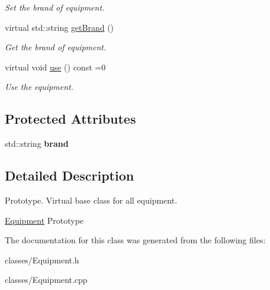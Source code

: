 \begin{DoxyCompactItemize}
\begin{DoxyCompactList}\small\item\em Set the brand of equipment. \end{DoxyCompactList}\item 
\hypertarget{class_equipment_adf98a9485c7dd511ee55b34e328f2eb0}{}virtual std\+::string \hyperlink{class_equipment_adf98a9485c7dd511ee55b34e328f2eb0}{get\+Brand} ()\label{class_equipment_adf98a9485c7dd511ee55b34e328f2eb0}

\begin{DoxyCompactList}\small\item\em Get the brand of equipment. \end{DoxyCompactList}\item 
\hypertarget{class_equipment_ad353e0121f958ee31f56ef7a7b4ff1e0}{}virtual void \hyperlink{class_equipment_ad353e0121f958ee31f56ef7a7b4ff1e0}{use} () const  =0\label{class_equipment_ad353e0121f958ee31f56ef7a7b4ff1e0}

\begin{DoxyCompactList}\small\item\em Use the equipment. \end{DoxyCompactList}\end{DoxyCompactItemize}
\subsection*{Protected Attributes}
\begin{DoxyCompactItemize}
\item 
\hypertarget{class_equipment_ac92b9e665801fbf45368c11470631d26}{}std\+::string {\bfseries brand}\label{class_equipment_ac92b9e665801fbf45368c11470631d26}

\end{DoxyCompactItemize}


\subsection{Detailed Description}
Prototype. Virtual base class for all equipment.

\hyperlink{class_equipment}{Equipment} Prototype 

The documentation for this class was generated from the following files\+:\begin{DoxyCompactItemize}
\item 
classes/Equipment.\+h\item 
classes/Equipment.\+cpp\end{DoxyCompactItemize}
